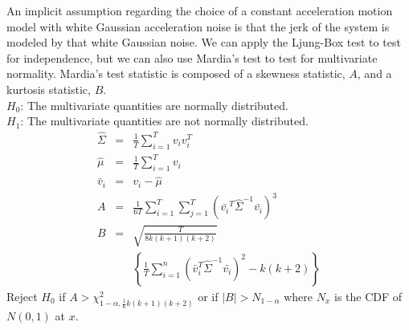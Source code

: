 \medskip
{} An implicit assumption regarding the choice of a constant acceleration motion model with white Gaussian acceleration noise is that the jerk of the system is modeled by that white Gaussian noise.  We can apply the Ljung-Box test to test for independence, but we can also use Mardia's test to test for multivariate normality.  Mardia's test statistic is composed of a skewness statistic, $A$, and a kurtosis statistic, $B$.\\
$H_0$: The multivariate quantities are normally distributed.\\
$H_1$: The multivariate quantities are not normally distributed.\\
\begin{eqnarray*}
\hat{\Sigma} &=& \frac{1}{T}\sum_{i=1}^Tv_iv_i^T\\
\hat{\mu} &=& \frac{1}{T}\sum_{i=1}^Tv_i\\
\bar{v}_i &=& v_i - \hat{\mu}\\
A &=& \frac{1}{6T}\sum_{i=1}^T\sum_{j=1}^T(\bar{v_i}^T \hat{\Sigma}^{-1} \bar{v_i})^3\\
B &=& \sqrt{\frac{T}{8k(k+1)(k+2)}} \\&&\left\{\frac{1}{T}\sum_{i=1}^n(\bar{v}_i^T \hat{\Sigma}^{-1} \bar{v_i})^2 - k(k+2)\right\}
\end{eqnarray*}
Reject $H_0$ if $A > \chi^2_{1-\alpha, \frac{1}{6}k(k+1)(k+2)}$ or if $|B| > N_{1-\alpha}$ where $N_x$ is the CDF of $N(0,1)$ at $x$.
